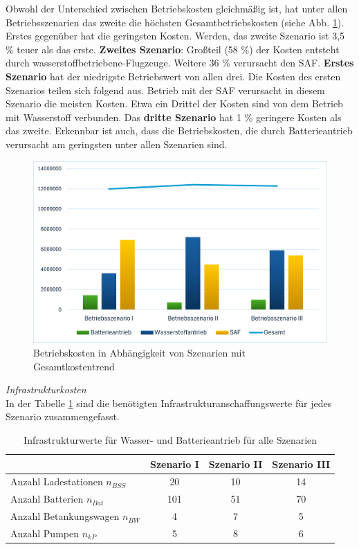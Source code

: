 Obwohl der Unterschied zwischen Betriebskosten gleichmäßig ist, hat unter allen Betriebsszenarien das zweite die höchsten Gesamtbetriebskosten (siehe Abb. \ref{res_betriebsszenarien}). 
Erstes gegenüber hat die geringsten Kosten. Werden, das zweite Szenario ist 3,5 \% teuer als das erste.
\textbf{Zweites Szenario}: Großteil (58 \%) der Kosten entsteht durch wasserstoffbetriebene-Flugzeuge. Weitere 36 \% verursacht den SAF.
\textbf{Erstes Szenario} hat der niedrigste Betriebswert von allen drei. Die Kosten des ersten Szenarios teilen sich folgend aus. 
Betrieb mit der SAF verursacht in diesem Szenario die meisten Kosten. Etwa ein Drittel
der Kosten sind von dem Betrieb mit Wasserstoff verbunden.
Das \textbf{dritte Szenario} hat 1 \% geringere Kosten als das zweite.
Erkennbar ist auch, dass die Betriebskosten, die durch Batterieantrieb verursacht am geringsten unter allen Szenarien sind.
\begin{figure}[h]
	\centering
	\includegraphics[width=0.8\linewidth]{Bilder/betriebssz_res.png}
	\caption[Betriebskosten in Abhängigkeit von Szenarien mit Gesamtkostentrend]{Betriebskosten in Abhängigkeit von Szenarien mit Gesamtkostentrend}
	\label{res_betriebsszenarien}
\end{figure}

\textit{Infrastrukturkosten}\\
In der Tabelle \ref{Infrastrukturwerte_res} sind die benötigten 
Infrastrukturanschaffungswerte für jedes Szenario zusammengefasst. 

\begin{table}[h]
	\begin{center}
    \caption{Infrastrukturwerte für Wasser- und Batterieantrieb für alle Szenarien}
	\label{Infrastrukturwerte_res}
	\begin{tabular}{|l|c|c|c|}
		\hline
		 & \textbf{Szenario I}& \textbf{Szenario II}& \textbf{Szenario III} \\ \hline
		Anzahl Ladestationen $n_{BSS}$ & 20 & 10& 14\\ \hline
		Anzahl Batterien $n_{Bat}$ & 101 & 51& 70 \\ \hline
		Anzahl Betankungswagen $n_{BW}$ & 4 & 7 & 5\\ \hline
		Anzahl Pumpen $n_{kP}$  & 5 & 8 & 6\\ \hline
	\end{tabular}
    \end{center}
\end{table}

